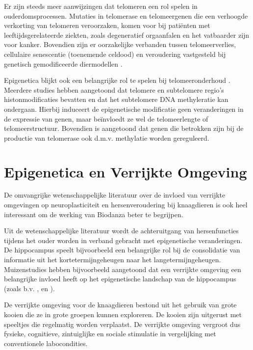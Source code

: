 \documentclass[
  11pt,
]{book}
\begin{document}
Er zijn steeds meer aanwijzingen dat telomeren een rol spelen in ouderdomsprocessen. Mutaties in telomerase en telomeergenen die een verhoogde verkorting van telomeren veroorzaken, komen voor bij patiënten met leeftijdsgerelateerde ziekten, zoals degeneratief orgaanfalen en het vatbaarder zijn voor kanker. Bovendien zijn er oorzakelijke verbanden tussen telomeerverlies, cellulaire senescentie (toenemende celdood) en veroudering vastgesteld bij genetisch gemodificeerde diermodellen \citep{Adwan2018}.

Epigenetica blijkt ook een belangrijke rol te spelen bij telomeeronderhoud \citep{Adwan2018}.
Meerdere studies hebben aangetoond dat telomere en subtelomere regio's histonmodificaties bevatten en dat het subtelomere DNA methyleratie kan ondergaan.
Hierbij induceert de epigenetische modificatie geen veranderingen in de expressie van genen, maar beïnvloedt ze wel de telomeerlengte of telomeerstructuur.
Bovendien is aangetoond dat genen die betrokken zijn bij de productie van telomerase ook d.m.v. methylatie worden gereguleerd.

\hypertarget{epigenetica-en-verrijkte-omgeving}{%
\section{Epigenetica en Verrijkte Omgeving}\label{epigenetica-en-verrijkte-omgeving}}

De omvangrijke wetenschappelijke literatuur over de invloed van verrijkte omgevingen op neuroplasticiteit en hersenveroudering bij knaagdieren is ook heel interessant om de werking van Biodanza beter te begrijpen.

Uit de wetenschappelijke literatuur wordt de achteruitgang van hersenfuncties tijdens het ouder worden in verband gebracht met epigenetische veranderingen. De hippocampus speelt bijvoorbeeld een belangrijke rol bij de consolidatie van informatie uit het kortetermijngeheugen naar het langetermijngeheugen. Muizenstudies hebben bijvoorbeeld aangetoond dat een verrijkte omgeving een belangrijke invloed heeft op het epigenetische landschap van de hippocampus (zoals b.v. \citet{zocher2021}, en \citet{grinan2016}).

De verrijkte omgeving voor de knaagdieren bestond uit het gebruik van grote kooien die ze in grote groepen kunnen exploreren. De kooien zijn uitgerust met speeltjes die regelmatig worden verplaatst. De verrijkte omgeving vergroot dus fysieke, cognitieve, zintuiglijke en sociale stimulatie in vergelijking met conventionele labocondities.
\end{document}
